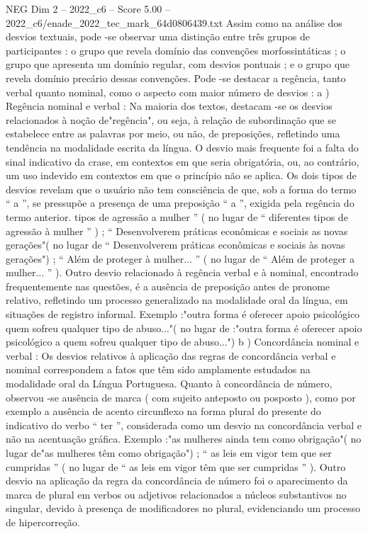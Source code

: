 \begin{textsample}{NEG Dim 2 – 2022\_c6 – Score 5.00 – 2022\_c6/enade\_2022\_tec\_mark\_64d0806439.txt}
Assim como na análise dos desvios textuais, pode -se observar uma distinção entre três grupos de participantes : o grupo que revela domínio das convenções morfossintáticas ; o grupo que apresenta um domínio regular, com desvios pontuais ; e o grupo que revela domínio precário dessas convenções.
Pode -se destacar a regência, tanto verbal quanto nominal, como o aspecto com maior número de desvios : a ) Regência nominal e verbal : Na maioria dos textos, destacam -se os desvios relacionados à noção de"regência", ou seja, à relação de subordinação que se estabelece entre as palavras por meio, ou não, de preposições, refletindo uma tendência na modalidade escrita da língua.
O desvio mais frequente foi a falta do sinal indicativo da crase, em contextos em que seria obrigatória, ou, ao contrário, um uso indevido em contextos em que o princípio não se aplica.
Os dois tipos de desvios revelam que o usuário não tem consciência de que, sob a forma do termo “ a ”, se pressupõe a presença de uma preposição “ a ”, exigida pela regência do termo anterior. tipos de agressão a mulher ” ( no lugar de “ diferentes tipos de agressão à mulher ” ) ; “ Desenvolverem práticas econômicas e sociais as novas gerações"( no lugar de “ Desenvolverem práticas econômicas e sociais às novas gerações") ; “ Além de proteger à mulher... ” ( no lugar de “ Além de proteger a mulher... ” ).
Outro desvio relacionado à regência verbal e à nominal, encontrado frequentemente nas questões, é a ausência de preposição antes de pronome relativo, refletindo um processo generalizado na modalidade oral da língua, em situações de registro informal.
Exemplo :"outra forma é oferecer apoio psicológico quem sofreu qualquer tipo de abuso..."( no lugar de :"outra forma é oferecer apoio psicológico a quem sofreu qualquer tipo de abuso...") b ) Concordância nominal e verbal : Os desvios relativos à aplicação das regras de concordância verbal e nominal correspondem a fatos que têm sido amplamente estudados na modalidade oral da Língua Portuguesa.
Quanto à concordância de número, observou -se ausência de marca ( com sujeito anteposto ou posposto ), como por exemplo a ausência de acento circunflexo na forma plural do presente do indicativo do verbo “ ter ”, considerada como um desvio na concordância verbal e não na acentuação gráfica.
Exemplo :"as mulheres ainda tem como obrigação"( no lugar de"as mulheres têm como obrigação") ; “ as leis em vigor tem que ser cumpridas ” ( no lugar de “ as leis em vigor têm que ser cumpridas ” ).
Outro desvio na aplicação da regra da concordância de número foi o aparecimento da marca de plural em verbos ou adjetivos relacionados a núcleos substantivos no singular, devido à presença de modificadores no plural, evidenciando um processo de hipercorreção.

\end{textsample}
